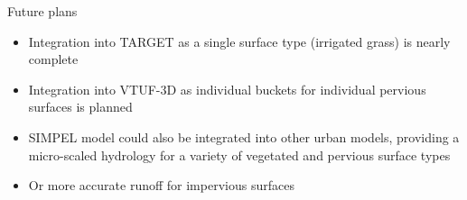 \documentclass{beamer}
\begin{document}
\begin{frame}{Future plans} 

\begin{itemize}

\item Integration into TARGET as a single surface type (irrigated grass) is nearly complete

\item Integration into VTUF-3D as individual buckets for individual pervious surfaces is planned

\item SIMPEL model could also be integrated into other urban models, providing a micro-scaled hydrology for a variety of vegetated and pervious surface types

\item Or more accurate runoff for impervious surfaces

\end{itemize}


\end{frame}



%
%


%
\end{document}
